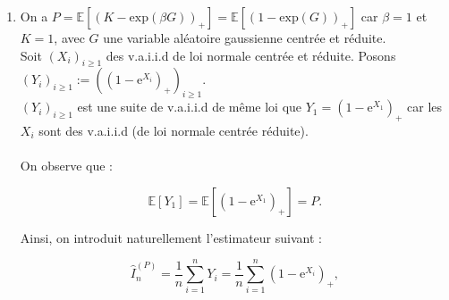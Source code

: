 \documentclass{article}
\theoremstyle{exostyle}
\newenvironment{questions}{
\begin{enumerate}[\hspace{12pt} 1.]}{\end{enumerate}}
\begin{document}
\begin{questions}
On a vu précédemment que $N(1) = 0,8413$. Pour $N(2)$ on se réfère aussi à la table de la loi normale centrée réduite et on trouve que $N(2) = 0,9772$. On a donc : 

\hspace{2.41cm}


\bigbreak

\underline{\textbf{Algorithme de Monte Carlo :}}\\

On peut écrire un algorithme de Monte Carlo car les hypothèses sont vérifiées (en particulier $\mathbb{E} [Y_{1}^{2} ] < \infty)$. Le code Matlab de l'algorithme de Monte Carlo associé à ce point ainsi que le graphique correspondant et les valeurs que nous renvoie le programme est consultable en \textbf{Annexe B - pages 1, 2 et 3}.\\

J'ai exécuté le programme pour différentes valeurs de $n$ : \\

\texttt{[image: Tableau\_1.PNG]}

\bigbreak
\bigbreak

\item On a $P = \mathbb{E} [(K-\text{exp}(\beta G))_{+}] = \mathbb{E}[(1-\text{exp}(G))_{+}]$ car $\beta = 1$ et $K = 1$, avec $G$ une variable aléatoire  gaussienne centrée et réduite.\\
Soit $(X_{i})_{i \geq 1}$ des v.a.i.i.d de loi normale centrée et réduite. Posons $(Y_{i})_{i \geq 1} := \left(\left( 1-\text{e}^{X_{i}}\right)_{+}\right)_{i \geq 1}$.\\
$(Y_{i})_{i \geq 1}$ est une suite de v.a.i.i.d de même loi que $Y_{1} = \left( 1-\text{e}^{X_{1}} \right)_{+}$ car les $X_{i}$ sont des v.a.i.i.d (de loi normale centrée réduite).\\
\\

On observe que : 

\[\mathbb{E} [Y_{1}] = \mathbb{E} \left[ \left(1-\text{e}^{X_{1}} \right)_{+} \right] = P.\]

Ainsi, on introduit naturellement l'estimateur suivant :

\[\hat{I}_{n}^{(P)} = \frac{1}{n} \sum_{i=1}^{n} Y_{i} = \frac{1}{n} \sum_{i=1}^{n} \left( 1-\text{e}^{X_{i}} \right)_{+},\]


\end{questions}
\end{document}
